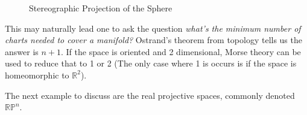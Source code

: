 \documentclass{article}                                                        %
\begin{document}
        \begin{figure}[H]
            \centering
            \captionsetup{type=figure}
            
            \caption{Stereographic Projection of the Sphere}
            \label{fig:Sphere_Stereographic_Proj}
        \end{figure}
        This may naturally lead one to ask the question
        \textit{what's the minimum number of charts needed to cover a manifold?}
        Ostrand's theorem from topology tells us the answer is $n+1$. If the
        space is oriented and 2 dimensional, Morse theory can be used to reduce
        that to 1 or 2 (The only case where 1 is occurs is if the space is
        homeomorphic to $\mathbb{R}^{2}$).
        \par\hfill\par
        The next example to discuss are the real projective spaces, commonly
        denoted $\mathbb{RP}^{n}$.
\end{document}
